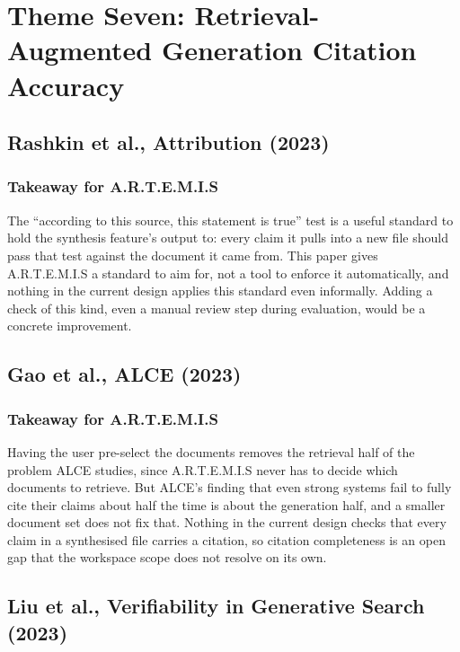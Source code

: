 \documentclass[11pt,a4paper]{report}
\newcommand{\artemis}{A.R.T.E.M.I.S}
\begin{document}
\section{Theme Seven: Retrieval-Augmented Generation Citation Accuracy}

\subsection{Rashkin et al., Attribution (2023)}

\subsubsection{Takeaway for \artemis{}}

The \enquote{according to this source, this statement is true} test is a
useful standard to hold the synthesis feature's output to: every claim
it pulls into a new file should pass that test against the document it
came from. This paper gives \artemis{} a standard to aim for, not a tool
to enforce it automatically, and nothing in the current design applies
this standard even informally. Adding a check of this kind, even a
manual review step during evaluation, would be a concrete improvement.

\subsection{Gao et al., ALCE (2023)}

\subsubsection{Takeaway for \artemis{}}

Having the user pre-select the documents removes the retrieval half of
the problem ALCE studies, since \artemis{} never has to decide which
documents to retrieve. But ALCE's finding that even strong systems fail
to fully cite their claims about half the time is about the generation
half, and a smaller document set does not fix that. Nothing in the
current design checks that every claim in a synthesised file carries a
citation, so citation completeness is an open gap that the workspace
scope does not resolve on its own.

\subsection{Liu et al., Verifiability in Generative Search (2023)}
\end{document}
